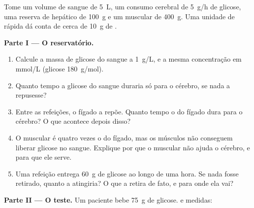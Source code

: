 \begin{problem}
\label{pb:g12:glucose-and-diabetes:1}
Tome um volume de sangue de \qty{5}{L}, um consumo cerebral de
\qty{5}{g/h} de glicose, uma reserva de  hepático de
\qty{100}{g} e um  muscular de \qty{400}{g}. Uma unidade de
 rápida dá conta de cerca de \qty{10}{g} de .

\medskip
\noindent\textbf{Parte I --- O reservatório.}
\begin{enumerate}
  \item Calcule a massa de glicose do sangue a \qty{1}{g/L}, e a mesma
        concentração em \unit{mmol/L} (glicose \qty{180}{g/mol}).
  \item Quanto tempo a glicose do sangue duraria só para o cérebro, se
        nada a repusesse?
  \item Entre as refeições, o fígado a repõe. Quanto tempo o 
        do fígado dura para o cérebro? O que acontece depois disso?
  \item O  muscular é quatro vezes o do fígado, mas os
        músculos não conseguem liberar glicose no sangue. Explique por
        que o  muscular não ajuda o cérebro, e para que ele serve.
  \item Uma refeição entrega \qty{60}{g} de glicose ao longo de uma
        hora. Se nada fosse retirado, quanto a  atingiria? O que
        a retira de fato, e para onde ela vai?
\end{enumerate}

\medskip
\noindent\textbf{Parte II --- O teste.}
Um paciente bebe \qty{75}{g} de glicose.  e  medidas:


\end{problem}
